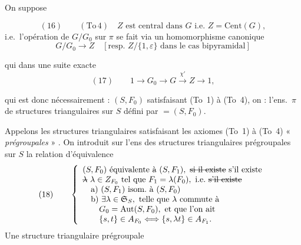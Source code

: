 \documentclass[11pt,a4paper]{article}
\begin{document}
On suppose

\[
(16)\qquad (\mathrm{To}\,4)\quad Z \text{ est central dans } G \text{ i.e.\ } Z=\mathrm{Cent}(G),
\]
i.e.\ l'opération de $G/G_0$ sur $\pi$ se fait
\struck{\ill{}} via un homomorphisme canonique
\[
G/G_0 \longrightarrow Z \quad [\text{resp.\ } Z/\{1,\varepsilon\} \text{ dans le cas bipyramidal}]
\]

qui  dans une suite exacte
\[
(17)\qquad 1\longrightarrow G_0\longrightarrow G\xrightarrow{\ \chi'\ } Z\longrightarrow 1 ,
\]


qui est donc nécessairement  :
\struck{\ill{}} $(S,F_0)$ satisfaisant (To~1) à (To~4), on
 : l'ens.\ $\pi$ de structures triangulaires sur
$S$ défini par  $=(S,F_0)$.

Appelons les structures triangulaires satisfaisant
les axiomes (To~1) à (To~4) « \emph{prégroupales}  »
. On introduit sur l'ens des
 structures triangulaires prégroupales sur
\struck{\ill{}} $S$ la relation d'équivalence
\[
(18)\qquad \left\{\begin{array}{l}
(S,F_0) \text{ équivalente à } (S,F_1), \text{ \struck{si il existe} s'il existe}\\
\text{\struck{$\lambda$}}\ \lambda\in Z_{F_0} \text{ tel que } F_1=\lambda(F_0), \text{ i.e.\ \struck{s'il existe}}\\
\quad \text{a) } (S,F_1) \text{ isom.\ à } (S,F_0)\\
\quad \text{b) } \exists\lambda\in\mathfrak{S}_S, \text{ telle que } \lambda \text{ commute à}\\
\qquad G_0=\mathrm{Aut}(S,F_0), \text{ et que l'on ait}\\
\qquad \{s,t\}\in A_{F_0} \Longleftrightarrow \{s,\lambda t\}\in A_{F_1}.
\end{array}\right.
\]
 Une structure triangulaire prégroupale
\end{document}
